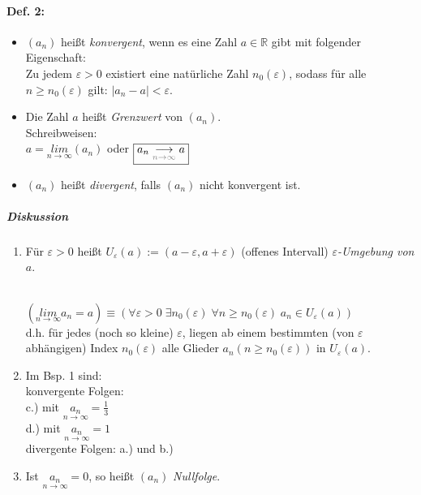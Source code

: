 \paragraph{Def. 2:} 
\begin{itemize}
\item $(a_n)$ heißt \emph{konvergent}, wenn es eine Zahl $a \in \mathbb{R}$ gibt mit folgender Eigenschaft:\\
Zu jedem $\varepsilon > 0$ existiert eine natürliche Zahl $n_0(\varepsilon)$, sodass für alle $n \geq n_0(\varepsilon)$ gilt: $|a_n-a|< \varepsilon$.
\item Die Zahl $a$ heißt \emph{Grenzwert} von $(a_n)$.\\
Schreibweisen:\\
$\boxed{a=\underset{n\rightarrow \infty}{lim}(a_n)}$ oder $\boxed{a_n \underset{\color{gray}n\rightarrow\infty}{\longrightarrow} a}$
\item $(a_n)$ heißt \emph{divergent}, falls $(a_n)$ nicht konvergent ist.
\end{itemize}
\subparagraph{Diskussion}
\begin{enumerate}
\item Für $\varepsilon>0$ heißt $U_{\varepsilon}(a):=(a-\varepsilon, a+\varepsilon)$ (offenes Intervall) \emph{$\varepsilon$-Umgebung von $a$}.\\
\\
$\left( \underset{n\rightarrow \infty}{lim}a_n=a\right)\equiv \left( \forall\varepsilon>0 \; \exists n_0(\varepsilon) \; \forall n\geq n_0(\varepsilon) \; a_n \in U_{\varepsilon}(a)\right)$\\
d.h. für jedes (noch so kleine) $\varepsilon$, liegen ab einem bestimmten (von $\varepsilon$ abhängigen) Index $n_0(\varepsilon)$ alle Glieder $a_n(n\geq n_0(\varepsilon))$ in $U_{\varepsilon}(a)$.
\item Im Bsp. 1 sind:\\
konvergente Folgen: \\
c.) mit $\underset{n\rightarrow\infty}{a_n}=\frac{1}{3}$\\
d.) mit $\underset{n\rightarrow\infty}{a_n}=1$\\
divergente Folgen: a.) und b.)
\item Ist $\underset{n\rightarrow\infty}{a_n}=0$, so heißt $(a_n)$ \emph{Nullfolge}.
\end{enumerate}

